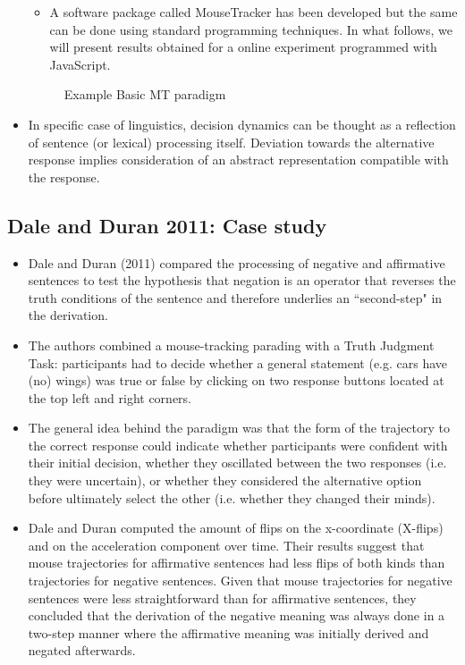 \documentclass{article}
\begin{document}
\begin{itemize}
\begin{itemize}
\item A software package called MouseTracker has been developed but the same can be done using standard programming techniques. In what follows, we will present results obtained for a online experiment programmed with JavaScript. 

\end{itemize}

\begin{figure}[h]
\caption{Example Basic MT paradigm}
\end{figure}

\item In specific case of linguistics, decision dynamics can be thought as a reflection of sentence (or lexical) processing itself. Deviation towards the alternative response implies consideration of an abstract representation compatible with the response. 

\end{itemize}

\subsection{Dale and Duran 2011: Case study}

\begin{itemize}
\item Dale and Duran (2011) compared the processing of negative and affirmative sentences to test the hypothesis that negation is an operator that reverses the truth conditions of the sentence and therefore underlies an “second-step" in the derivation. 

\item The authors combined a mouse-tracking parading with a Truth Judgment Task: participants had to decide whether a general statement (e.g. cars have (no) wings) was true or false by clicking on two response buttons located at the top left and right corners.

\item The general idea behind the paradigm was that the form of the trajectory to the correct response could indicate whether participants were confident with their initial decision, whether they oscillated between the two responses (i.e. they were uncertain), or whether they considered the alternative option before ultimately select the other (i.e. whether they changed their minds). 

\item Dale and Duran computed the amount of flips on the x-coordinate (X-flips) and on the acceleration component over time. Their results suggest that mouse trajectories for affirmative sentences had less flips of both kinds than trajectories for negative sentences. Given that mouse trajectories for negative sentences were less straightforward than for affirmative sentences, they concluded that the derivation of the negative meaning was always done in a two-step manner where the affirmative meaning was initially derived and negated afterwards.    

\end{itemize}
\end{document}
